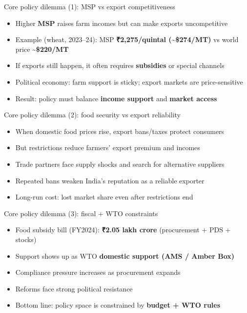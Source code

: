 \documentclass[
  ignorenonframetext,
  aspectratio=169,
]{beamer}
\makeatletter
\providecommand{\tightlist}{%
  \setlength{\itemsep}{0pt}\setlength{\parskip}{0pt}}
\let\quarto@originallabel\label
\DeclareRobustCommand*{\label}[1]{\quarto@originallabel{#1}}
\makeatother
\begin{document}
\begin{frame}
\begin{block}{Core policy dilemma (1): MSP vs export competitiveness}
\label{core-policy-dilemma-1-msp-vs-export-competitiveness}
\begin{itemize}
\tightlist
\item
  Higher \textbf{MSP} raises farm incomes but can make exports
  uncompetitive
\item
  Example (wheat, 2023--24): MSP \textbf{₹2,275/quintal
  (\textasciitilde\$274/MT)} vs world price
  \textbf{\textasciitilde\$220/MT}
\item
  If exports still happen, it often requires \textbf{subsidies} or
  special channels
\item
  Political economy: farm support is sticky; export markets are
  price-sensitive
\item
  Result: policy must balance \textbf{income support} and \textbf{market
  access}
\end{itemize}
\end{block}
\end{frame}

\begin{frame}
\begin{block}{Core policy dilemma (2): food security vs export
reliability}
\label{core-policy-dilemma-2-food-security-vs-export-reliability}
\begin{itemize}
\tightlist
\item
  When domestic food prices rise, export bans/taxes protect consumers
\item
  But restrictions reduce farmers' export premium and incomes
\item
  Trade partners face supply shocks and search for alternative suppliers
\item
  Repeated bans weaken India's reputation as a reliable exporter
\item
  Long-run cost: lost market share even after restrictions end
\end{itemize}
\end{block}
\end{frame}

\begin{frame}
\begin{block}{Core policy dilemma (3): fiscal + WTO constraints}
\label{core-policy-dilemma-3-fiscal-wto-constraints}
\begin{itemize}
\tightlist
\item
  Food subsidy bill (FY2024): \textbf{₹2.05 lakh crore} (procurement +
  PDS + stocks)
\item
  Support shows up as WTO \textbf{domestic support (AMS / Amber Box)}
\item
  Compliance pressure increases as procurement expands
\item
  Reforms face strong political resistance
\item
  Bottom line: policy space is constrained by \textbf{budget + WTO
  rules}
\end{itemize}
\end{block}
\end{frame}
\end{document}
